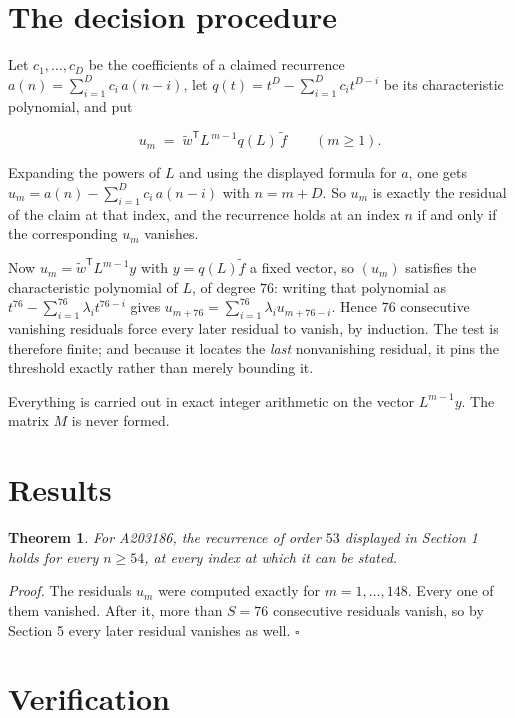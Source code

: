 \documentclass[11pt]{article}
\newtheorem{theorem}{Theorem}
\theoremstyle{definition}
\begin{document}
\section{The decision procedure}

Let $c_1,\dots,c_D$ be the coefficients of a claimed recurrence $a(n) = \sum_{i=1}^{D} c_i\,a(n-i)$, let $q(t) = t^{D} - \sum_{i=1}^{D} c_i t^{D-i}$ be its characteristic polynomial, and put

\[u_m \;=\; \tilde w^{\mathsf T} L^{\,m-1} q(L)\,\tilde f \qquad (m \ge 1).\]

Expanding the powers of $L$ and using the displayed formula for $a$, one gets $u_m = a(n) - \sum_{i=1}^{D} c_i\,a(n-i)$ with $n = m + D$. So $u_m$ is exactly the residual of the claim at that index, and the recurrence holds at an index $n$ if and only if the corresponding $u_m$ vanishes.

Now $u_m = \tilde w^{\mathsf T} L^{m-1} y$ with $y = q(L)\tilde f$ a fixed vector, so $(u_m)$ satisfies the characteristic polynomial of $L$, of degree $76$: writing that polynomial as $t^{76} - \sum_{i=1}^{76} \lambda_i t^{76-i}$ gives $u_{m+76} = \sum_{i=1}^{76} \lambda_i u_{m+76-i}$. Hence $76$ consecutive vanishing residuals force every later residual to vanish, by induction. The test is therefore finite; and because it locates the {\itshape last} nonvanishing residual, it pins the threshold exactly rather than merely bounding it.

Everything is carried out in exact integer arithmetic on the vector $L^{m-1}y$. The matrix $M$ is never formed.

\section{Results}

\begin{theorem} For A203186, the recurrence of order $53$ displayed in Section 1 holds for every $n \ge 54$, at every index at which it can be stated.\end{theorem}

{\itshape Proof.} The residuals $u_m$ were computed exactly for $m = 1,\dots,148$. Every one of them vanished. After it, more than $S = 76$ consecutive residuals vanish, so by Section 5 every later residual vanishes as well. $\square$

\section{Verification}
\end{document}
